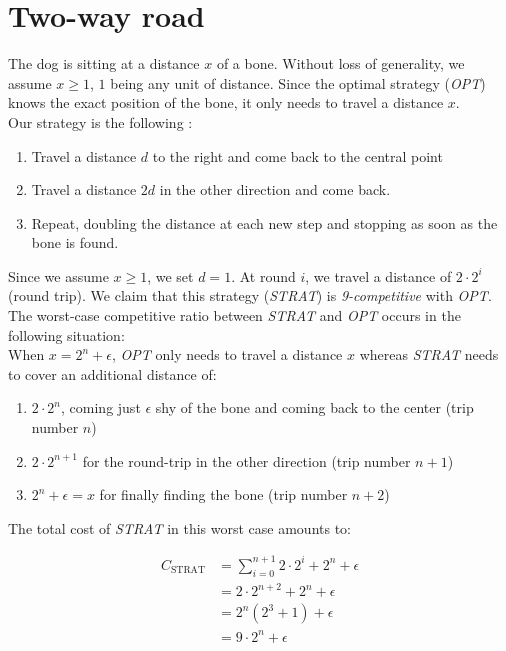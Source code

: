 
\section{Two-way road}
The dog is sitting at a distance $x$ of a bone. Without loss of generality, we assume $x \geq 1$, $1$ being any unit of distance. Since the optimal strategy (\textit{OPT}) knows the exact position of the bone, it only needs to travel a distance $x$.\\

Our strategy is the following :
\begin{enumerate}
  \item Travel a distance $d$ to the right and come back to the central point
  \item Travel a distance $2d$ in the other direction and come back.
  \item Repeat, doubling the distance at each new step and stopping as soon as the bone is found.
\end{enumerate}

Since we assume $x \geq 1$, we set $d = 1$. At round $i$, we travel a distance of $2 \cdot 2^i$ (round trip). We claim that this strategy (\textit{STRAT}) is \textit{9-competitive} with \textit{OPT}. The worst-case competitive ratio between \textit{STRAT} and \textit{OPT} occurs in the following situation:\\
When $x = 2^n + \epsilon$, \textit{OPT} only needs to travel a distance $x$ whereas \textit{STRAT} needs to cover an additional distance of:
\begin{enumerate}
  \item $2 \cdot 2^n$, coming just $\epsilon$ shy of the bone and coming back to the center (trip number $n$)
  \item $2 \cdot 2^{n+1}$ for the round-trip in the other direction (trip number $n+1$)
  \item $2^n + \epsilon = x$ for finally finding the bone (trip number $n+2$)
\end{enumerate}

The total cost of \textit{STRAT} in this worst case amounts to:

\[
\begin{array}{ll}
  C_\text{STRAT} & = \sum_{i=0}^{n+1} {2 \cdot 2^i} + 2^n + \epsilon \\
                 & = 2 \cdot 2^{n+2} + 2^n + \epsilon \\
                 & = 2^n (2^3 + 1) + \epsilon \\
                 & = 9 \cdot 2^n + \epsilon
\end{array}
\]

